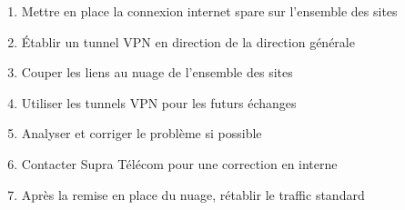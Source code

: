 \documentclass{article}
\newcommand{\spr}{Supra Télécom\xspace}
\begin{document}
\bigskip

\begin{enumerate}
  \item Mettre en place la connexion internet spare sur l'ensemble des sites
  \item Établir un tunnel VPN en direction de la direction générale
  \item Couper les liens au nuage de l'ensemble des sites
  \item Utiliser les tunnels VPN pour les futurs échanges
  \item Analyser et corriger le problème si possible
  \item Contacter \spr pour une correction en interne
  \item Après la remise en place du nuage, rétablir le traffic standard
\end{enumerate}
\end{document}
